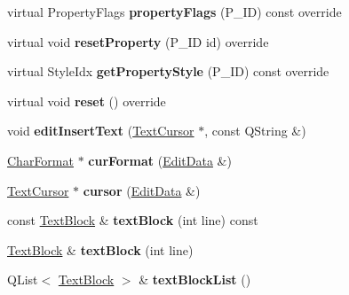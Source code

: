 \begin{DoxyCompactItemize}
virtual Property\+Flags {\bfseries property\+Flags} (P\+\_\+\+ID) const override
\item 
\mbox{\label{class_ms_1_1_text_a2ac1a75a1a1835fb7ba348bf2e9b3386}} 
virtual void {\bfseries reset\+Property} (P\+\_\+\+ID id) override
\item 
\mbox{\label{class_ms_1_1_text_af7620cc8105f1349da93e976ebf89126}} 
virtual Style\+Idx {\bfseries get\+Property\+Style} (P\+\_\+\+ID) const override
\item 
\mbox{\label{class_ms_1_1_text_a3ac63c17bb543fc1ff5e57a626aa4715}} 
virtual void {\bfseries reset} () override
\item 
\mbox{\label{class_ms_1_1_text_afd584590d50c39e41c3c2fffa4ca3b28}} 
void {\bfseries edit\+Insert\+Text} (\hyperlink{class_ms_1_1_text_cursor}{Text\+Cursor} $\ast$, const Q\+String \&)
\item 
\mbox{\label{class_ms_1_1_text_ade9e368490f838862597421080da428a}} 
\hyperlink{class_ms_1_1_char_format}{Char\+Format} $\ast$ {\bfseries cur\+Format} (\hyperlink{class_ms_1_1_edit_data}{Edit\+Data} \&)
\item 
\mbox{\label{class_ms_1_1_text_a5dc3dcdc8d9d1c03382a85578d642425}} 
\hyperlink{class_ms_1_1_text_cursor}{Text\+Cursor} $\ast$ {\bfseries cursor} (\hyperlink{class_ms_1_1_edit_data}{Edit\+Data} \&)
\item 
\mbox{\label{class_ms_1_1_text_a33c7f153162262ad3c83b06fe03e1757}} 
const \hyperlink{class_ms_1_1_text_block}{Text\+Block} \& {\bfseries text\+Block} (int line) const
\item 
\mbox{\label{class_ms_1_1_text_a439fc43781ce08d14cb2be48986f69f4}} 
\hyperlink{class_ms_1_1_text_block}{Text\+Block} \& {\bfseries text\+Block} (int line)
\item 
\mbox{\label{class_ms_1_1_text_a302e05e33994e1eb0f0411d5ba521a9d}} 
Q\+List$<$ \hyperlink{class_ms_1_1_text_block}{Text\+Block} $>$ \& {\bfseries text\+Block\+List} ()
\end{DoxyCompactItemize}
